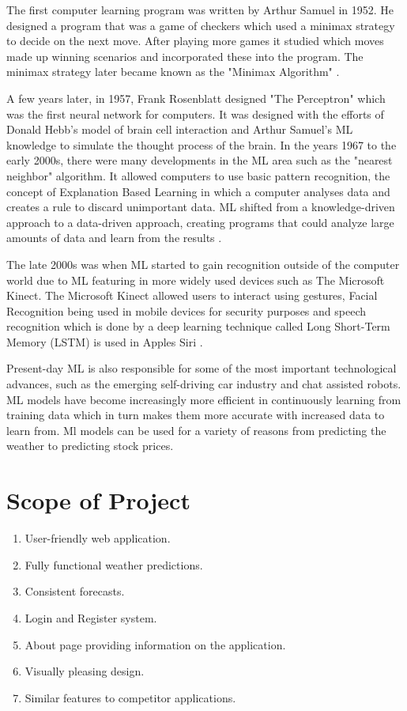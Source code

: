 The first computer learning program was written by Arthur Samuel in 1952. He designed a program that was a game of checkers which used a minimax strategy to decide on the next move. After playing more games it studied which moves made up winning scenarios and incorporated these into the program. The minimax strategy later became known as the "Minimax Algorithm" \cite{MiniMax}.

A few years later, in 1957, Frank Rosenblatt designed "The Perceptron" which was the first neural network for computers. It was designed with the efforts of Donald Hebb's model of brain cell interaction and Arthur Samuel's ML knowledge to simulate the thought process of the brain. In the years 1967 to the early 2000s, there were many developments in the ML area such as the "nearest neighbor" algorithm. It allowed computers to use basic pattern recognition, the concept of Explanation Based Learning in which a computer analyses data and creates a rule to discard unimportant data. ML shifted from a knowledge-driven approach to a data-driven approach, creating programs that could analyze large amounts of data and learn from the results \cite{MLAlgorithmsHistory}.

The late 2000s was when ML started to gain recognition outside of the computer world due to ML featuring in more widely used devices such as The Microsoft Kinect. The Microsoft Kinect allowed users to interact using gestures, Facial Recognition being used in mobile devices for security purposes and speech recognition which is done by a deep learning technique called Long Short-Term Memory (LSTM) is used in Apples Siri \cite{MLAlgorithmsHistory}.

Present-day ML is also responsible for some of the most important technological advances, such as the emerging self-driving car industry and chat assisted robots. ML models have become increasingly more efficient in continuously learning from training data which in turn makes them more accurate with increased data to learn from. Ml models can be used for a variety of reasons from predicting the weather to predicting stock prices.
\newpage
\section{Scope of Project}
\begin{enumerate}
\item User-friendly web application.
\item Fully functional weather predictions.
\item Consistent forecasts.
\item Login and Register system.
\item About page providing information on the application.
\item Visually pleasing design.
\item Similar features to competitor applications.
\end{enumerate}

